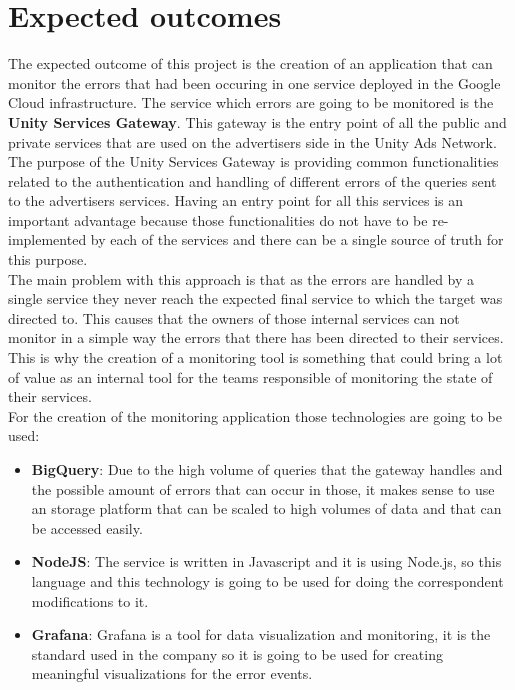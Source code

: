 \documentclass[12pt]{article}
\begin{document}
\section{Expected outcomes}

The expected outcome of this project is the creation of an application that can monitor the errors that had been occuring in one service deployed in the Google Cloud infrastructure. The service which errors are going to be monitored is the \textbf{Unity Services Gateway}. This gateway is the entry point of all the public and private services that are used on the advertisers side in the Unity Ads Network.\\

The purpose of the Unity Services Gateway is providing common functionalities related to the authentication and handling of different errors of the queries sent to the advertisers services. Having an entry point for all this services is an important advantage because those functionalities do not have to be re-implemented by each of the services and there can be a single source of truth for this purpose. \\

The main problem with this approach is that as the errors are handled by a single service they never reach the expected final service to which the target was directed to. This causes that the owners of those internal services can not monitor in a simple way the errors that there has been directed to their services. This is why the creation of a monitoring tool is something that could bring a lot of value as an internal tool for the teams responsible of monitoring the state of their services.\\

For the creation of the monitoring application those technologies are going to be used:

\begin{itemize}
    \item \textbf{BigQuery}: Due to the high volume of queries that the gateway handles and the possible amount of errors that can occur in those, it makes sense to use an storage platform that can be scaled to high volumes of data and that can be accessed easily.
    \item \textbf{NodeJS}: The service is written in Javascript and it is using Node.js, so this language and this technology is going to be used for doing the correspondent modifications to it.
    \item \textbf{Grafana}: Grafana is a tool for data visualization and monitoring, it is the standard used in the company so it is going to be used for creating meaningful visualizations for the error events.
\end{itemize}
\end{document}
